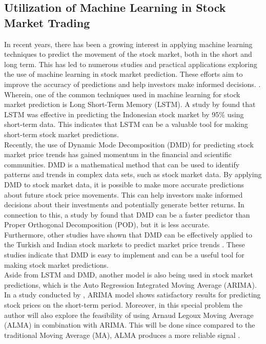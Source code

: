 \subsection{Utilization of Machine Learning in Stock Market Trading}
In recent years, there has been a growing interest in applying machine 
learning techniques to predict the movement of the stock market, 
both in the short and long term. This has led to numerous studies and 
practical applications exploring the use of machine learning in stock market prediction.
 These efforts aim to improve the accuracy of predictions and help investors make 
 informed decisions.
\cite{Kumbure2022, Strader2020, Soni2022, Rea2020, Guo2022}.
 Wherein, one of the common techniques used in machine learning for 
 stock market prediction is Long Short-Term Memory (LSTM). 
 A study by  found that LSTM was effective in predicting the 
 Indonesian stock market by 95\% using short-term data. 
 This indicates that LSTM can be a valuable tool for making short-term stock 
 market predictions.
\vspace{0.5cm}
\\Recently, the use of Dynamic Mode Decomposition (DMD) 
for predicting stock market price trends has gained momentum in the financial 
and scientific communities. DMD is a mathematical method that can be used 
to identify patterns and trends in complex data sets, such as stock market data.
By applying DMD to stock market data, it is possible to make more accurate 
predictions about future stock price movements. This can help investors make
informed decisions about their investments and potentially generate better returns.
In connection to this, a study by  found that DMD can be a 
faster predictor than Proper Orthogonal Decomposition (POD), but 
it is less accurate.
\vspace{0.5cm}
\\Furthermore, other studies have shown that DMD can be effectively 
applied to the Turkish and Indian stock markets to predict market price trends
\cite{Savas2017, Kuttichira2017}.
These studies indicate that DMD is easy to implement and can be a useful 
tool for making stock market predictions.
\vspace{0.5cm}
\\Aside from LSTM and DMD, another model is also being used in stock market predictions, 
which is the Auto Regression Integrated Moving Average (ARIMA). 
In a study conducted by , 
ARIMA model shows satisfactory results for predicting stock prices on the short-term period. 
Moreover, in this special problem the author will also explore the feasibility of using 
Arnaud Legoux Moving Average (ALMA) in combination with ARIMA. This will be done since 
compared to the traditional Moving Average (MA), 
ALMA produces a more reliable signal 
\cite{Sarkar2019}.